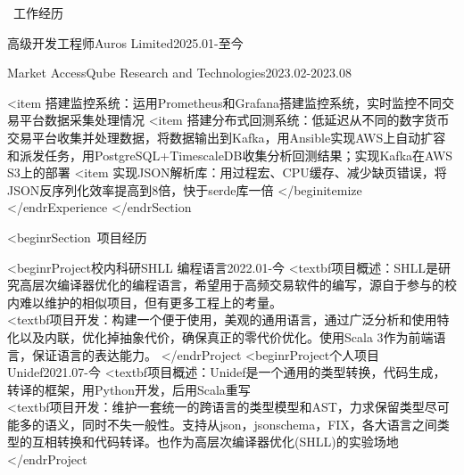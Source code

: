 \documentclass[UTF8]{resume}
\begin{document}
\begin{rSection}{\faBriefcase~工作经历}
\begin{rExperience}{高级开发工程师}{Auros Limited}{2025.01-至今}
\begin{itemize}
\begin{rExperience}{Market Access}{Qube Research and Technologies}{2023.02-2023.08}
\begin{itemize}
            <item 搭建监控系统：运用Prometheus和Grafana搭建监控系统，实时监控不同交易平台数据采集处理情况
            <item 搭建分布式回测系统：低延迟从不同的数字货币交易平台收集并处理数据，将数据输出到Kafka，用Ansible实现AWS上自动扩容和派发任务，用PostgreSQL+TimescaleDB收集分析回测结果；实现Kafka在AWS S3上的部署
            <item 实现JSON解析库：用过程宏、CPU缓存、减少缺页错误，将JSON反序列化效率提高到8倍，快于serde库一倍 
        </begin{itemize}
    </end{rExperience}
</end{rSection}

<begin{rSection}{\faUsers~项目经历}

    <begin{rProject}{校内科研}{SHLL 编程语言}{2022.01-今}
        <textbf{项目概述}：SHLL是研究高层次编译器优化的编程语言，希望用于高频交易软件的编写，源自于参与的校内难以维护的相似项目，但有更多工程上的考量。\\
        <textbf{项目开发}：构建一个便于使用，美观的通用语言，通过广泛分析和使用特化以及内联，优化掉抽象代价，确保真正的零代价优化。使用Scala 3作为前端语言，保证语言的表达能力。
    </end{rProject}
    <begin{rProject}{个人项目}{Unidef}{2021.07-今}
        <textbf{项目概述}：Unidef是一个通用的类型转换，代码生成，转译的框架，用Python开发，后用Scala重写\\
        <textbf{项目开发}：维护一套统一的跨语言的类型模型和AST，力求保留类型尽可能多的语义，同时不失一般性。支持从json，jsonschema，FIX，各大语言之间类型的互相转换和代码转译。也作为高层次编译器优化(SHLL)的实验场地
    </end{rProject}



\end{itemize}
\end{rExperience}
\end{itemize}
\end{rExperience}
\end{rSection}
\end{document}

